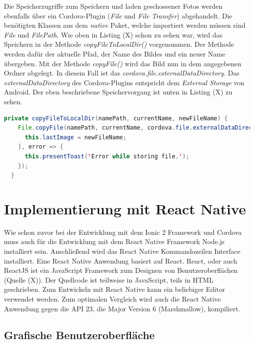 Die Speicherzugriffe zum Speichern und laden geschossener Fotos werden ebenfalls über ein Cordova-Plugin (\textit{File} und \textit{File Transfer}) abgehandelt. Die benötigten Klassen aus dem \textit{native} Paket, welche importiert werden müssen sind \textit{File} und \textit{FilePath}. Wie oben in Listing (X) schon zu sehen war, wird das Speichern in der Methode \textit{copyFileToLocalDir()} vorgenommen. Der Methode werden dafür der aktuelle Pfad, der Name des Bildes und ein neuer Name übergeben. Mit der Methode \textit{copyFile()} wird das Bild nun in dem angegebenen Ordner abgelegt. In diesem Fall ist das \textit{cordova.file.externalDataDirectory}. Das \textit{externalDataDirectory} des Cordova-Plugins entspricht dem \textit{External Storage} von Android. Der eben beschriebene Speichervorgang ist unten in Listing (X) zu sehen. 
\clearpage

\begin{lstlisting}[caption=Methode \textit{copyFileToLocalDir()} zum Speichern der aufgenommenen Bilder, label=lst:SavePictureIonic, language=Java]
private copyFileToLocalDir(namePath, currentName, newFileName) {
    File.copyFile(namePath, currentName, cordova.file.externalDataDirectory, newFileName).then(success => {
      this.lastImage = newFileName;
    }, error => {
      this.presentToast('Error while storing file.');
    });
  }
\end{lstlisting}


\section{Implementierung mit React Native}

Wie schon zuvor bei der Entwicklung mit dem Ionic 2 Framework und Cordova muss auch für die Entwicklung mit dem React Native Framework Node.js installiert sein. Anschließend wird das React Native Kommandozeilen Interface installiert. Eine React Native Anwendung basiert auf React. React, oder auch ReactJS ist ein JavaScript Framework zum Designen von Benutzeroberflächen (Quelle (X)). Der Quellcode ist teilweise in JavaScript, teils in HTML geschrieben. Zum Entwickeln mit React Native kann ein beliebiger Editor verwendet werden. Zum optimalen Vergleich wird auch die React Native Anwendung gegen die API 23, die Major Version 6 (Marshmallow), kompiliert.  

\subsection{Grafische Benutzeroberfläche}

